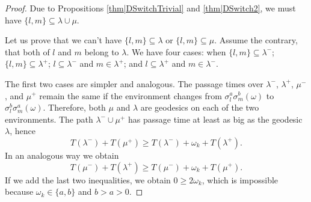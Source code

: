 \documentclass[reqno]{amsart}
\begin{document}
\begin{proof} Due to Propositions \ref{thm|DSwitchTrivial} and \ref{thm|DSwitch2}, we must have $\{l,m\}\subseteq\lambda\cup \mu$.

Let us prove that we can't have $\{l,m\}\subseteq\lambda$ or $\{l,m\}\subseteq \mu$. 
Assume the contrary, that both of $l$ and $m$ belong to $\lambda$. 
We have four cases: when $\{l,m\}\subseteq \lambda^-$; $\{l,m\}\subseteq \lambda^+$; $l\subseteq \lambda^-$ and $m\in\lambda^+$; and  $l\subseteq \lambda^+$ and $m\in\lambda^-$. 

The first two cases are simpler and analogous. The passage times over $\lambda^-$, $\lambda^+$, $\mu^-$, and $\mu^+$ remain the same if the environment changes from $\sigma_l^a\sigma_m^b(\omega)$ to
$\sigma_l^b\sigma_m^a(\omega)$. Therefore, both $\mu$ and $\lambda$ are geodesics on each of the two environments. 
The path $\lambda^-\cup \mu^+$ has passage time at least as big as the geodesic $\lambda$, hence
\[T(\lambda^-)+T(\mu^+)
\geq T(\lambda^-)+\omega_k+T(\lambda^+).\]
In an analogous way we obtain 
\[T(\mu^-)+T(\lambda^+)\geq T(\mu^-)+\omega_k+T(\mu^+).\]
If we add the last two inequalities, we obtain $0\geq 2\omega_k$, which is impossible because $\omega_k\in\{a,b\}$ and $b>a>0$. 



\end{proof}
\end{document}
